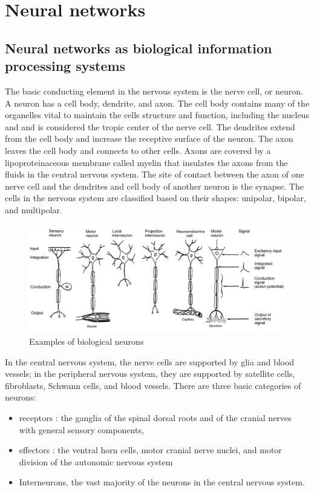 \section{Neural networks}

\subsection{Neural networks as biological information processing systems}
\FloatBarrier
The basic conducting element in the nervous system is the nerve cell, or neuron.
A neuron has a cell body, dendrite, and axon. The cell body contains many of the organelles 
vital to maintain the cells structure and function, including the nucleus and and is considered the
tropic center of the nerve cell.
The dendrites extend from the cell body and increase the receptive surface of the neuron.
The axon leaves the cell body and connects to other cells. Axons are covered by a lipoproteinaceous
membrane called myelin that insulates the axons from the fluids in the central nervous system.
The site of contact between the axon of one nerve cell and the dendrites and cell body of another 
neuron is the synapse. The cells in the nervous system are classified based on their shapes:
unipolar, bipolar, and multipolar. 
\begin{figure}[htb] 
	\label{fig:neurons}
	\centering
	\includegraphics[width=\textwidth]{figures/bio_neurons}
	\caption{Examples of biological neurons}
\end{figure}
In the central nervous system, the nerve cells are supported by glia and blood vessels;
in the peripheral nervous system, they are supported by satellite cells, fibroblasts,
Schwann cells, and blood vessels.
There are three basic categories of neurons:
\begin{itemize}
	\item receptors : the ganglia of the spinal dorsal roots and of the cranial nerves
		with general sensory components,
	\item effectors : the ventral horn cells, motor cranial nerve nuclei, and motor division of
		the autonomic nervous system
	\item Interneurons, the vast majority of the neurons in the central nervous system.
\end{itemize}
